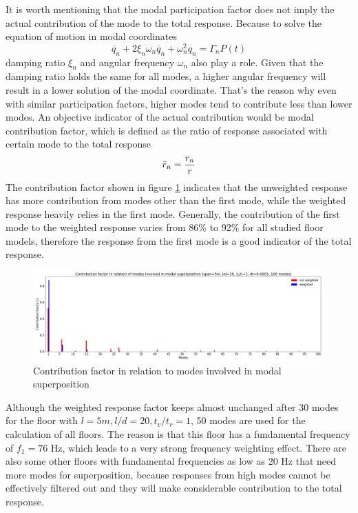 It is worth mentioning that the modal participation factor does not imply the actual contribution of the mode to the total response. Because to solve the equation of motion in modal coordinates
\begin{equation}
\ddot{q_n}+2\xi_n\omega_n\dot{q_n}+\omega_n^2q_n=\Gamma_nP(t)
\label{eqn:motion_q_1}
\end{equation}
\noindent   
damping ratio $\xi_n$ and angular frequency $\omega_n$ also play a role. Given that the damping ratio holds the same for all modes, a higher angular frequency will result in a lower solution of the modal coordinate. That's the reason why even with similar participation factors, higher modes tend to contribute less than lower modes. An objective indicator of the actual contribution would be modal contribution factor, which is defined as the ratio of response associated with certain mode to the total response
\begin{equation}
    \Bar{r}_n=\frac{r_n}{r}
\end{equation}
\noindent
The contribution factor shown in figure \ref{fig:contr_factor} indicates that the unweighted response has more contribution from modes other than the first mode, while the weighted response heavily relies in the first mode. Generally, the contribution of the first mode to the weighted response varies from 86\% to 92\% for all studied floor models, therefore the response from the first mode is a good indicator of the total response.  
\begin{figure}[H]
\centering
\includegraphics[width=1\textwidth]{images/contr_factor}
\caption{Contribution factor in relation to modes involved in modal superposition}
\label{fig:contr_factor}
\end{figure}

Although the weighted response factor keeps almost unchanged after 30 modes for the floor with $l=5m, l/d=20, t_v/t_r=1$, 50 modes are used for the calculation of all floors. The reason is that this floor has a fundamental frequency of $f_1=76$ Hz, which leads to a very strong frequency weighting effect. There are also some other floors with fundamental frequencies as low as 20 Hz that need more modes for superposition, because responses from high modes cannot be effectively filtered out and they will make considerable contribution to the total response.

